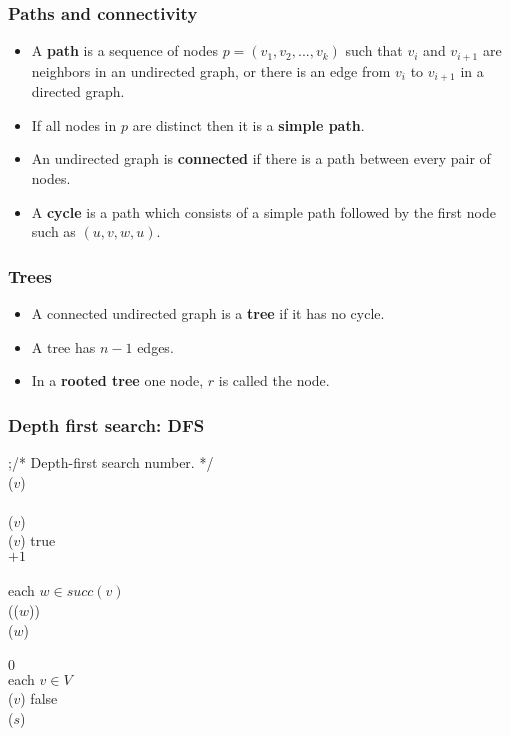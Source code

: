 \documentclass[trans]{beamer}
\begin{document}
\begin{frame}
\frametitle{Paths and connectivity}
\begin{itemize}
\item A {\bf path}  is a sequence of nodes $p = (v_1, v_2, ... , v_k)$ such that $v_i$ and $v_{i+1}$ are neighbors in 
an undirected graph, or there is an edge from $v_i$ to $v_{i+1}$ in a directed graph.
\item If all nodes in $p$ are distinct then it is a {\bf simple path}.
\item An undirected graph is {\bf connected} if there is a path between every pair of nodes.
\item A {\bf cycle} is a path which consists of a simple path followed by the first node such as $(u,v,w,u)$.
\end{itemize}
\end{frame}

\begin{frame}
\frametitle{Trees}
\begin{itemize}
\item A connected undirected graph is a {\bf tree} if it has no cycle.
\item A tree has $n-1$ edges.
\item In a {\bf rooted tree} one node, $r$ is called the node.
\end{itemize}
\end{frame}

\begin{frame}[fragile=singleslide]
\frametitle{Depth first search: DFS}
{\small
\begin{tabbing}
\ahdr
\INT \>;\>\>\>\>\>/* Depth-first search number. */	\\
\PROC {}($v$)						\\
\BEGIN								\\
\>($v$) \ASGN {}				\\
\>($v$) \ASGN true				\\
\> \ASGN {} $ + 1$				\\
								\\
\>\FOR each $w \in succ(v)$ \DO					\\
\>\>\IF (\NOT {}($w$)) 				\\
\>\>\>($w$)						\\
\END
\ahdr
\PROC {}				\\
\> \ASGN $0$						\\
\>\FOR each $v \in V$ \DO					\\
\>\>($v$) \ASGN false				\\
\>($s$)				\\
\END
\end{tabbing}
}
\end{frame}
\end{document}
